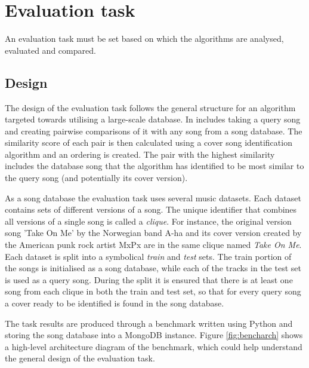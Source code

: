 
\chapter{Evaluation task}
\label{chap:task}
\ifpdf
    \graphicspath{{EvaluationTask/Figures/PNG/}{EvaluationTask/Figures/PDF/}{EvaluationTask/Figures/}}
\else
    \graphicspath{{EvaluationTask/Figures/EPS/}{EvaluationTask/Figures/}}
\fi


An evaluation task must be set based on which the algorithms are analysed,
evaluated and compared.

\section{Design} 
\label{sec:design}
The design of the evaluation task follows the general structure for an algorithm
targeted towards utilising a large-scale database. In includes taking a query
song and creating pairwise comparisons of it with any song from a song database.
The similarity score of each pair is then calculated using a cover song
identification algorithm and an ordering is created. The pair with the highest
similarity includes the database song that the algorithm has identified to be
most similar to the query song (and potentially its cover version). 

As a song database the evaluation task uses several music datasets. Each dataset
contains sets of different versions of a song. The unique identifier that
combines all versions of a single song is called a \textit{clique}. For
instance, the original version song 'Take On Me' by the Norwegian band A-ha and
its cover version created by the American punk rock artist MxPx are in the same
clique named \textit{Take On Me}. Each dataset is split into a symbolical
\textit{train} and \textit{test} sets. The train portion of the songs is
initialised as a song database, while each of the tracks in the test set is used
as a query song. During the split it is ensured that there is at least one song
from each clique in both the train and test set, so that for every query song a
cover ready to be identified is found in the song database.

The task results are produced through a benchmark written using Python
\cite{python} and storing the song database into a MongoDB \cite{mongodb}
instance. Figure \ref{fig:bencharch} shows a high-level architecture diagram of
the benchmark, which could help understand the general design of the evaluation task.

